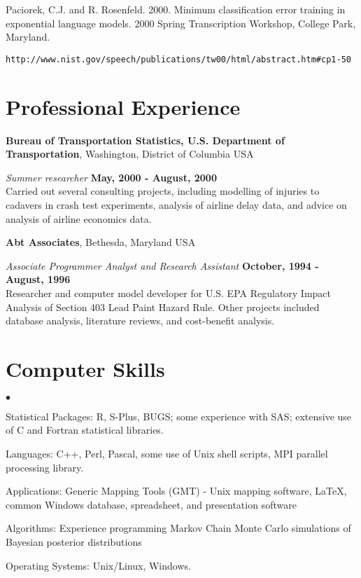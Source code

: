 \documentclass[overlapped,line]{res}
\newenvironment{list2}{
  \begin{list}{$\bullet$}{%
      \setlength{\itemsep}{0in}
      \setlength{\parsep}{0in} \setlength{\parskip}{0in}
      \setlength{\topsep}{0in} \setlength{\partopsep}{0in} 
      \setlength{\leftmargin}{0.2in}}}{\end{list}}
\begin{document}
\begin{resume}
Paciorek, C.J. and R. Rosenfeld.  2000.  Minimum classification error
training in exponential language models.  2000 Spring Transcription
Workshop, College Park, Maryland.
\vspace*{-.25in}  
\begin{verbatim}http://www.nist.gov/speech/publications/tw00/html/abstract.htm#cp1-50\end{verbatim}

\section{\sc Professional Experience}
{\bf Bureau of Transportation Statistics, U.S. Department of
  Transportation}, Washington, District of Columbia USA

\vspace{-.3cm}
{\em Summer researcher} \hfill {\bf May, 2000 - August, 2000}\\
Carried out several consulting projects, including modelling of
injuries to cadavers in crash test experiments, analysis of airline
delay data, and advice on analysis of airline economics data.

{\bf Abt Associates}, Bethesda, Maryland USA

\vspace{-.3cm}
{\em Associate Programmer Analyst and Research Assistant} \hfill {\bf
  October, 1994 - August, 1996}\\
Researcher and computer model developer for U.S. EPA Regulatory Impact
Analysis of Section 403 Lead Paint Hazard Rule.  Other projects
included database analysis, literature reviews, and cost-benefit analysis.

\section{\sc Computer Skills} 
\begin{list2}
\item Statistical Packages:  R, S-Plus, BUGS; some experience
  with SAS; extensive use of C and Fortran statistical libraries.
\item Languages:  C++, Perl, Pascal, some use of Unix shell scripts,
  MPI parallel processing library.
\item Applications: Generic Mapping Tools (GMT) - Unix mapping software, \LaTeX, common Windows
  database, spreadsheet, and presentation software
\item Algorithms: Experience programming Markov Chain Monte Carlo
  simulations of Bayesian posterior distributions
\item Operating Systems:  Unix/Linux, Windows.\\ 
\end{list2}



\end{resume}
\end{document}
